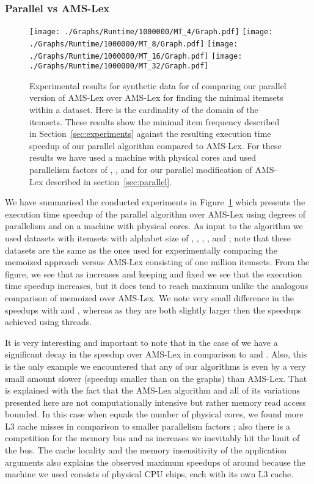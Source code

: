 \documentclass[13pt,a4paper]{article}
\begin{document}
\subsubsection{Parallel vs AMS-Lex}
\label{sec:exp:synth:prallel_AMS}

\begin{figure} [t]
	\centering
	\texttt{[image: ./Graphs/Runtime/1000000/MT\_4/Graph.pdf]}
	\texttt{[image: ./Graphs/Runtime/1000000/MT\_8/Graph.pdf]}
	\texttt{[image: ./Graphs/Runtime/1000000/MT\_16/Graph.pdf]}
	\texttt{[image: ./Graphs/Runtime/1000000/MT\_32/Graph.pdf]}
	\caption{Experimental results for synthetic data for  of comparing our parallel version of AMS-Lex over AMS-Lex for finding the minimal itemsets within a dataset. Here  is the cardinality of the domain of the itemsets. These results show the minimal item frequency described in Section~\ref{sec:experiments} against the resulting execution time speedup of our parallel algorithm compared to AMS-Lex. For these results we have used a machine with  physical cores and used parallelism factors of , ,  and  for our parallel modification of AMS-Lex described in section~\ref{sec:parallel}.}
	\label{fig:exp:parallel}
\end{figure}

We have summarised the conducted experiments in Figure~\ref{fig:exp:parallel} which presents the execution time speedup of the parallel algorithm over AMS-Lex using degrees of parallelism  and  on a machine with  physical cores. As input to the algorithm we used datasets with  itemsets with alphabet size of , , , ,  and ; note that these datasets are the same as the ones used for experimentally comparing the memoized approach versus AMS-Lex consisting of one million itemsets. From the figure, we see that as  increases and keeping  and  fixed we see that the execution time speedup increases, but it does tend to reach maximum unlike the analogous comparison of memoized over AMS-Lex. We note very small difference in the speedups with  and , whereas as they are both slightly larger then the speedups achieved using  threads.

It is very interesting and important to note that in the case of  we have a significant decay in the speedup over AMS-Lex in comparison to  and . Also, this is the only example we encountered that any of our algorithms is even by a very small amount slower (speedup smaller than  on the graphs) than AMS-Lex. That is explained with the fact that the AMS-Lex algorithm and all of its variations presented here are not computationally intensive but rather memory read access bounded. In this case when  equals the number of physical cores, we found more L3 cache misses in comparison to smaller parallelism factors ; also there is a competition for the memory bus and as  increases we inevitably hit the limit of the bus. The cache locality and the memory insensitivity of the application arguments also explains the observed maximum speedups of around  because the machine we used consists of  physical CPU chips, each with its own L3 cache.
\end{document}
